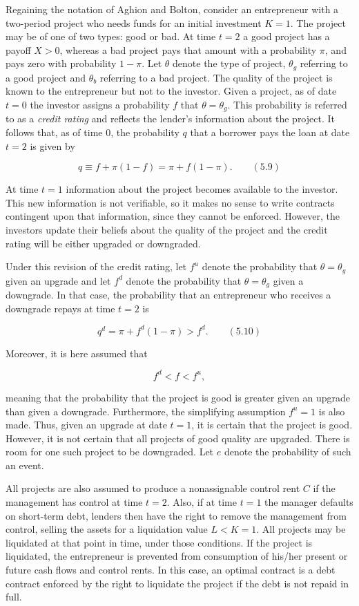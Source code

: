 \documentclass[11pt,a4paper]{article}
\begin{document}
Regaining the notation of Aghion and Bolton, consider an entrepreneur with a two-period project who
needs funds for an initial investment \(K = 1\). The project may be of one of two types: good or
bad. At time \(t = 2\) a good project has a payoff \(X > 0\), whereas a bad project pays that amount
with a probability \(\pi\), and pays zero with probability \(1 - \pi\). Let \(\theta\) denote the
type of project, \(\theta_g\) referring to a good project and \(\theta_b\) referring to a bad
project. The quality of the project is known to the entrepreneur but not to the investor. Given a
project, as of date \(t = 0\) the investor assigns a probability \(f\) that \(\theta = \theta_g\).
This probability is referred to as a \emph{credit rating} and reflects the lender's information
about the project. It follows that, as of time 0, the probability \(q\) that a borrower pays the
loan at date \(t = 2\) is given by

\[q \equiv f + \pi(1 - f) = \pi + f(1 - \pi). \qquad (5.9)\]

At time \(t = 1\) information about the project becomes available to the investor. This new
information is not verifiable, so it makes no sense to write contracts contingent upon that
information, since they cannot be enforced. However, the investors update their beliefs about the
quality of the project and the credit rating will be either upgraded or downgraded.

Under this revision of the credit rating, let \(f^u\) denote the probability that
\(\theta = \theta_g\) given an upgrade and let \(f^d\) denote the probability that
\(\theta = \theta_g\) given a downgrade. In that case, the probability that an entrepreneur who
receives a downgrade repays at time \(t = 2\) is

\[q^d = \pi + f^d(1 - \pi) > f^d. \qquad (5.10)\]

Moreover, it is here assumed that

\[f^d < f < f^u,\]

meaning that the probability that the project is good is greater given an upgrade than given a
downgrade. Furthermore, the simplifying assumption \(f^u = 1\) is also made. Thus, given an upgrade
at date \(t = 1\), it is certain that the project is good. However, it is not certain that all
projects of good quality are upgraded. There is room for one such project to be downgraded. Let
\(e\) denote the probability of such an event.

All projects are also assumed to produce a nonassignable control rent \(C\) if the management has
control at time \(t = 2\). Also, if at time \(t = 1\) the manager defaults on short-term debt,
lenders then have the right to remove the management from control, selling the assets for a
liquidation value \(L < K = 1\). All projects may be liquidated at that point in time, under those
conditions. If the project is liquidated, the entrepreneur is prevented from consumption of his/her
present or future cash flows and control rents. In this case, an optimal contract is a debt contract
enforced by the right to liquidate the project if the debt is not repaid in full.
\end{document}
